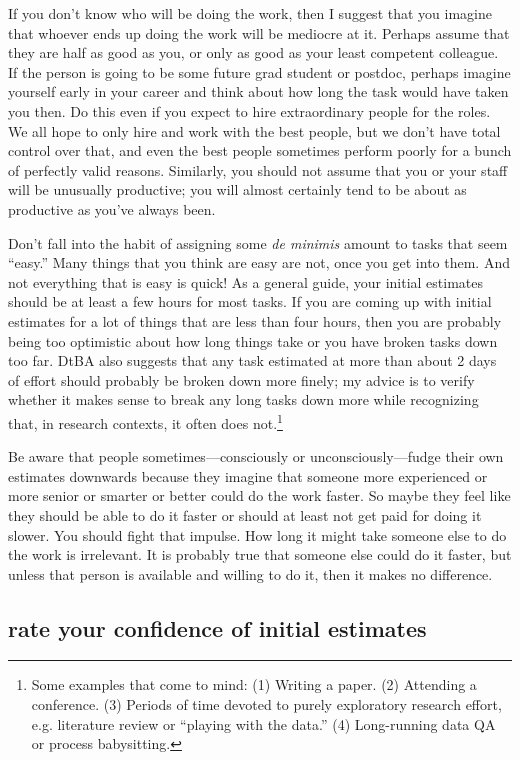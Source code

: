 \documentclass[12pt,oneside]{book}
\begin{document}
If you don't know who will be doing the work, then I suggest that you imagine that whoever ends up doing the work will be mediocre at it. Perhaps assume that they are half as good as you, or only as good as your least competent colleague. If the person is going to be some future grad student or postdoc, perhaps imagine yourself early in your career and think about how long the task would have taken you then. Do this even if you expect to hire extraordinary people for the roles. We all hope to only hire and work with the best people, but we don't have total control over that, and even the best people sometimes perform poorly for a bunch of perfectly valid reasons. Similarly, you should not assume that you or your staff will be unusually productive; you will almost certainly tend to be about as productive as you've always been.

Don't fall into the habit of assigning some \emph{de minimis} amount to tasks that seem ``easy.'' Many things that you think are easy are not, once you get into them. And not everything that is easy is quick! As a general guide, your initial estimates should be at least a few hours for most tasks. If you are coming up with initial estimates for a lot of things that are less than four hours, then you are probably being too optimistic about how long things take or you have broken tasks down too far. DtBA also suggests that any task estimated at more than about 2 days of effort should probably be broken down more finely; my advice is to verify whether it makes sense to break any long tasks down more while recognizing that, in research contexts, it often does not.\footnote{Some examples that come to mind: (1) Writing a paper. (2) Attending a conference. (3) Periods of time devoted to purely exploratory research effort, e.g. literature review or ``playing with the data.'' (4) Long-running data QA or process babysitting.}

Be aware that people sometimes---consciously or unconsciously---fudge their own estimates downwards because they imagine that someone more experienced or more senior or smarter or better could do the work faster. So maybe they feel like they should be able to do it faster or should at least not get paid for doing it slower. You should fight that impulse. How long it might take someone else to do the work is irrelevant. It is probably true that someone else could do it faster, but unless that person is available and willing to do it, then it makes no difference.


\subsection*{rate your confidence of initial estimates}
\label{scrivauto:36}
\end{document}
